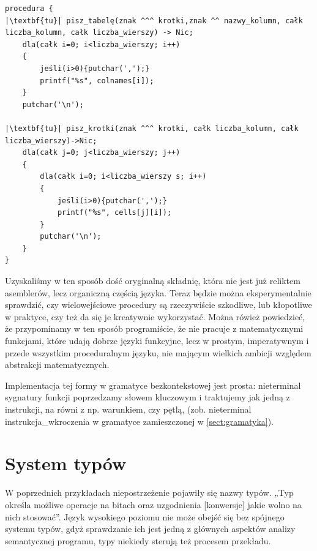 
\begin{lstlisting}
procedura {
|\textbf{tu}| pisz_tabelę(znak ^^^ krotki,znak ^^ nazwy_kolumn, całk liczba_kolumn, całk liczba_wierszy) -> Nic;
    dla(całk i=0; i<liczba_wierszy; i++)
    {
        jeśli(i>0){putchar(',');}
        printf("%s", colnames[i]);
    }
    putchar('\n');
    
|\textbf{tu}| pisz_krotki(znak ^^^ krotki, całk liczba_kolumn, całk liczba_wierszy)->Nic;
    dla(całk j=0; j<liczba_wierszy; j++)
    {
        dla(całk i=0; i<liczba_wierszy s; i++)
        {
            jeśli(i>0){putchar(',');}
            printf("%s", cells[j][i]);
        }
        putchar('\n');
    }
}
\end{lstlisting}
Uzyskaliśmy w ten sposób dość oryginalną składnię, która nie jest już reliktem asemblerów, lecz organiczną częścią języka. Teraz będzie można eksperymentalnie sprawdzić, czy wielowejściowe procedury są rzeczywiście szkodliwe, lub kłopotliwe w praktyce, czy też da się je kreatywnie wykorzystać. Można rówież powiedzieć, że przypominamy w ten sposób programiście, że nie pracuje z matematycznymi funkcjami, które udają dobrze języki funkcyjne, lecz w prostym, imperatywnym i przede wszystkim proceduralnym języku, nie mającym wielkich ambicji względem abstrakcji matematycznych.

Implementacja tej formy w gramatyce bezkontekstowej jest prosta: nieterminal sygnatury funkcji poprzedzamy słowem kluczowym i traktujemy jak jedną z instrukcji, na równi z np. warunkiem, czy pętlą, (zob. nieterminal instrukcja\_wkroczenia w gramatyce zamieszczonej w \ref{sect:gramatyka}).

\section{System typów}
W poprzednich przykładach niepostrzeżenie pojawiły się nazwy typów. „Typ określa możliwe operacje na bitach oraz uzgodnienia [konwersje] jakie wolno na nich stosować”\cite[str.~259]{waite_goos}. Język wysokiego poziomu nie może obejść się bez spójnego systemu typów, gdyż sprawdzanie ich jest jedną z głównych aspektów analizy semantycznej programu, typy niekiedy sterują też procesem przekładu.

